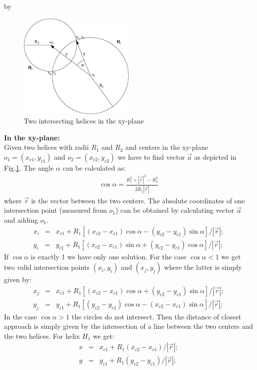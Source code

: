 \documentclass[twoside]{article}
\newcommand{\entrylabel}[1]{\mbox{\textbf{{#1}}}\hfil}%
\newenvironment{entry}
{\begin{list}{}%
    {\renewcommand{\makelabel}{\entrylabel}%
     \setlength{\labelwidth}{90pt}%
     \setlength{\leftmargin}{\labelwidth}
     \advance\leftmargin by \labelsep%
      }%
    }%
  {\end{list}}
\newcommand{\Entrylabel}[1]%
{\raisebox{0pt}[1ex][0pt]{\makebox[\labelwidth][l]%
    {\parbox[t]{\labelwidth}{\hspace{0pt}\textbf{{#1}}}}}}
\newenvironment{Entry}%
{\renewcommand{\entrylabel}{\Entrylabel}\begin{entry}}%
  {\end{entry}}
\begin{document}
\begin{description}
\begin{Entry}
\begin{figure}[hbt]  
    \begin{center}
        \includegraphics[width=0.5\textwidth]{twoHelices.eps}
        \caption{Two intersecting helices in the xy-plane}
    \end{center}
    \label{fig:dcahelices}
\end{figure}
{\bf In the xy-plane:}\\
Given two helices with radii $R_1$ and $R_2$ and centers in the
xy-plane $o_1 = (x_{c1}, y_{c1})$ and $o_2 = (x_{c2}, y_{c2})$ we have
to find vector $\vec{a}$ as depicted in Fig.\ref{fig:dcahelices}.  The
angle $\alpha$ can be calculated as:
\begin{eqnarray}
    \cos \alpha = \frac{R^2_1 + |\vec{r}|^2 - R^2_2}{2 R_1 |\vec{r}|}
\end{eqnarray}
where $\vec{r}$ is the vector between the two centers. The absolute
coordinates of one intersection point (measured from $o_1$) can be
obtained by calculating vector $\vec{a}$ and adding $o_1$.
\begin{eqnarray}
    x_i &=& x_{c1} + R_1 [ (x_{c2}-x_{c1}) \cos \alpha -  (y_{c2}-y_{c1}) \sin \alpha]/|\vec{r}|;\\
    y_i &=& y_{c1} + R_1 [ (x_{c2}-x_{c1}) \sin \alpha +  (y_{c2}-y_{c1}) \cos \alpha]/|\vec{r}|;
\end{eqnarray}
If $\cos \alpha$ is exactly 1 we have only one solution. For the case
$\cos \alpha < 1$ we get two valid intersection points $(x_i, y_i)$
and $(x_j, y_j)$ where the latter is simply given by:
\begin{eqnarray}
    x_j &=& x_{c1} + R_1 [ (x_{c2}-x_{c1}) \cos \alpha +  (y_{c2}-y_{c1}) \sin \alpha]/|\vec{r}|;\\
    y_j &=& y_{c1} + R_1 [ (y_{c2}-y_{c1}) \cos \alpha -  (x_{c2}-x_{c1}) \sin \alpha]/|\vec{r}|;
\end{eqnarray}
In the case $\cos \alpha > 1$ the circles do not intersect. Then the
distance of closest approach is simply given by the intersection of a
line between the two centers and the two helices. For helix $H_1$ we
get:
\begin{eqnarray}
    x &=& x_{c1} + R_1 (x_{c2}-x_{c1})/|\vec{r}|;\\
    y &=& y_{c1} + R_1 (y_{c2}-y_{c1})/|\vec{r}|;
\end{eqnarray}



\end{Entry}
\end{description}
\end{document}
